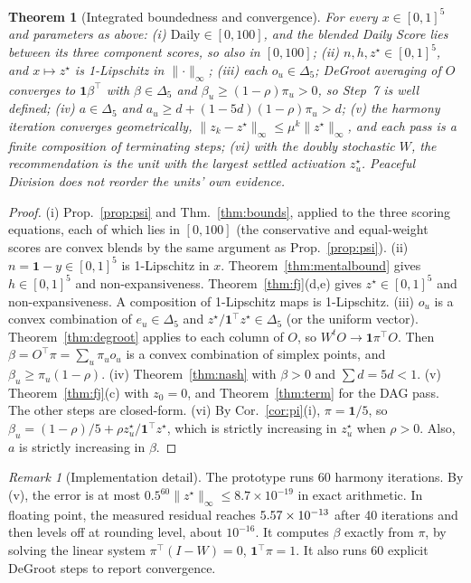 \documentclass[11pt]{article}
\newtheorem{theorem}{Theorem}
\theoremstyle{definition}
\theoremstyle{remark}
\newtheorem{remark}{Remark}
\newcommand{\Simp}{\Delta}
\newcommand{\one}{\mathbf{1}}
\newcommand{\ninf}[1]{\lVert #1\rVert_\infty}
\begin{document}
\begin{theorem}[Integrated boundedness and convergence]\label{thm:integration}
For every $x\in[0,1]^5$ and parameters as above:
(i) $\text{Daily}\in[0,100]$, and the blended Daily Score lies between its three component scores, so also in $[0,100]$;
(ii) $n,h,z^\star\in[0,1]^5$, and $x\mapsto z^\star$ is 1-Lipschitz in $\ninf{\cdot}$;
(iii) each $o_u\in\Simp_5$; DeGroot averaging of $O$ converges to $\one\beta^\top$ with $\beta\in\Simp_5$ and $\beta_u\ge(1-\rho)\pi_u>0$, so Step~7 is well defined;
(iv) $a\in\Simp_5$ and $a_u\ge d+(1-5d)(1-\rho)\pi_u>d$;
(v) the harmony iteration converges geometrically, $\ninf{z_k-z^\star}\le\mu^k\ninf{z^\star}$, and each pass is a finite composition of terminating steps;
(vi) with the doubly stochastic $W$, the recommendation is the unit with the largest settled activation $z^\star_u$. Peaceful Division does not reorder the units' own evidence.
\end{theorem}
\begin{proof}
(i) Prop.~\ref{prop:psi} and Thm.~\ref{thm:bounds}, applied to the three scoring equations, each of which lies in $[0,100]$ (the conservative and equal-weight scores are convex blends by the same argument as Prop.~\ref{prop:psi}).
(ii) $n=\one-y\in[0,1]^5$ is 1-Lipschitz in $x$. Theorem~\ref{thm:mentalbound} gives $h\in[0,1]^5$ and non-expansiveness. Theorem~\ref{thm:fj}(d,e) gives $z^\star\in[0,1]^5$ and non-expansiveness. A composition of 1-Lipschitz maps is 1-Lipschitz.
(iii) $o_u$ is a convex combination of $e_u\in\Simp_5$ and $z^\star/\one^\top z^\star\in\Simp_5$ (or the uniform vector). Theorem~\ref{thm:degroot} applies to each column of $O$, so $W^tO\to\one\pi^\top O$. Then $\beta=O^\top\pi=\sum_u\pi_uo_u$ is a convex combination of simplex points, and $\beta_u\ge\pi_u(1-\rho)$.
(iv) Theorem~\ref{thm:nash} with $\beta>0$ and $\sum d=5d<1$.
(v) Theorem~\ref{thm:fj}(c) with $z_0=0$, and Theorem~\ref{thm:term} for the DAG pass. The other steps are closed-form.
(vi) By Cor.~\ref{cor:pi}(i), $\pi=\one/5$, so $\beta_u=(1-\rho)/5+\rho z^\star_u/\one^\top z^\star$, which is strictly increasing in $z^\star_u$ when $\rho>0$. Also, $a$ is strictly increasing in $\beta$.
\end{proof}

\begin{remark}[Implementation detail]
The prototype runs 60 harmony iterations. By (v), the error is at most $0.5^{60}\ninf{z^\star}\le 8.7\times10^{-19}$ in exact arithmetic. In floating point, the measured residual reaches $5.57\times10^{-13}$ after 40 iterations and then levels off at rounding level, about $10^{-16}$. It computes $\beta$ exactly from $\pi$, by solving the linear system $\pi^\top(I-W)=0$, $\one^\top\pi=1$. It also runs 60 explicit DeGroot steps to report convergence.
\end{remark}
\end{document}
